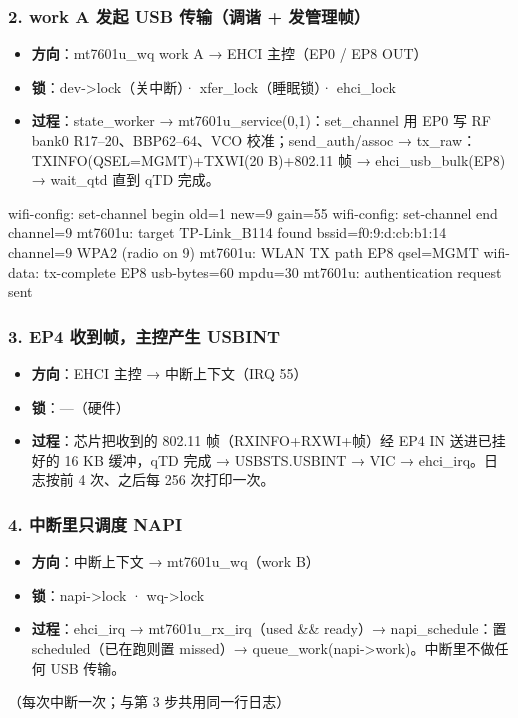 \documentclass[UTF8,zihao=-4,fontset=none]{ctexart}
\begin{document}
\subsubsection*{2. work A 发起 USB 传输（调谐 + 发管理帧）}
\begin{itemize}[leftmargin=2em,itemsep=1pt]
\item \textbf{方向}：mt7601u\_wq work A → EHCI 主控（EP0 / EP8 OUT）
\item \textbf{锁}：dev->lock（关中断）· xfer\_lock（睡眠锁）· ehci\_lock
\item \textbf{过程}：state\_worker → mt7601u\_service(0,1)：set\_channel 用 EP0 写 RF bank0 R17–20、BBP62–64、VCO 校准；send\_auth/assoc → tx\_raw：TXINFO(QSEL=MGMT)+TXWI(20 B)+802.11 帧 → ehci\_usb\_bulk(EP8) → wait\_qtd 直到 qTD 完成。
\end{itemize}
\begin{logv}
wifi-config: set-channel begin old=1 new=9 gain=55
wifi-config: set-channel end channel=9
mt7601u: target TP-Link_B114 found bssid=f0:9:d:cb:b1:14 channel=9 WPA2 (radio on 9)
mt7601u: WLAN TX path EP8 qsel=MGMT
wifi-data: tx-complete EP8 usb-bytes=60 mpdu=30
mt7601u: authentication request sent
\end{logv}

\subsubsection*{3. EP4 收到帧，主控产生 USBINT}
\begin{itemize}[leftmargin=2em,itemsep=1pt]
\item \textbf{方向}：EHCI 主控 → 中断上下文（IRQ 55）
\item \textbf{锁}：—（硬件）
\item \textbf{过程}：芯片把收到的 802.11 帧（RXINFO+RXWI+帧）经 EP4 IN 送进已挂好的 16 KB 缓冲，qTD 完成 → USBSTS.USBINT → VIC → ehci\_irq。日志按前 4 次、之后每 256 次打印一次。
\end{itemize}

\subsubsection*{4. 中断里只调度 NAPI}
\begin{itemize}[leftmargin=2em,itemsep=1pt]
\item \textbf{方向}：中断上下文 → mt7601u\_wq（work B）
\item \textbf{锁}：napi->lock · wq->lock
\item \textbf{过程}：ehci\_irq → mt7601u\_rx\_irq（used \&\& ready）→ napi\_schedule：置 scheduled（已在跑则置 missed）→ queue\_work(napi->work)。中断里不做任何 USB 传输。
\end{itemize}
\begin{logv}
（每次中断一次；与第 3 步共用同一行日志）
\end{logv}
\end{document}
